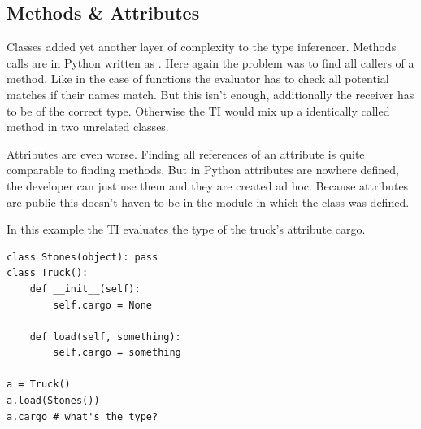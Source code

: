 \documentclass[12pt,halfparskip,DIV11,BCOR10mm]{scrreprt}
\begin{document}
\subsection{Methods \& Attributes}

Classes added yet another layer of complexity to the type inferencer. Methods calls are in Python written as . Here again the problem was to find all callers of a method. Like in the case of functions the evaluator has to check all potential matches if their names match. But this isn't enough,  additionally the receiver has to be of the correct type. Otherwise the TI would mix up a identically called method in two unrelated classes. 

Attributes are even worse. Finding all references of an attribute is quite comparable to finding methods. But in Python attributes are nowhere defined, the developer can just use them and they are created ad hoc. Because attributes are public this doesn't haven to be in the module in which the class was defined.

In this example the TI evaluates the type of the truck's attribute cargo.

\begin{lstlisting}
class Stones(object): pass
class Truck():
    def __init__(self):
        self.cargo = None
    
    def load(self, something):
        self.cargo = something

a = Truck()
a.load(Stones())
a.cargo # what's the type?
\end{lstlisting}
\end{document}
